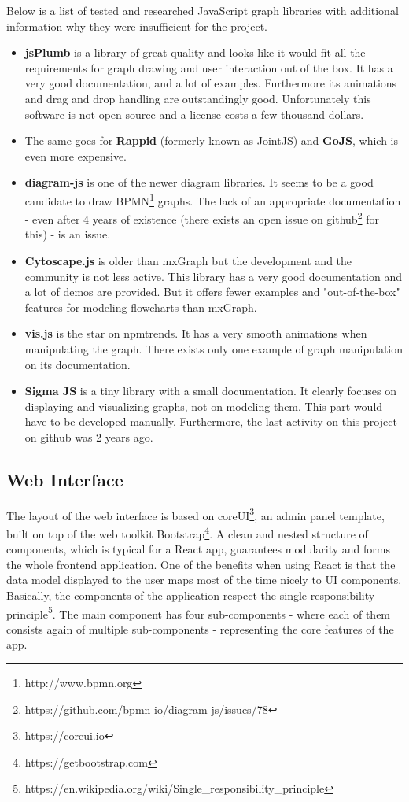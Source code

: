 \documentclass[a4paper,11pt,pdftex,halfparskip,cleardoubleempty,bibtotoc,liststotoc]{scrbook}
\begin{document}
Below is a list of tested and researched JavaScript graph libraries with additional information why they were insufficient for the project.
\begin{itemize}
	\item \textbf{jsPlumb} is a library of great quality and looks like it would fit all the requirements for graph drawing and user interaction out of the box. It has a very good documentation, and a lot of examples. Furthermore its animations and drag and drop handling are outstandingly good. Unfortunately this software is not open source and a license costs a few thousand dollars.
	\item The same goes for \textbf{Rappid} (formerly known as JointJS) and \textbf{GoJS}, which is even more expensive.
	\item \textbf{diagram-js} is one of the newer diagram libraries. It seems to be a good candidate to draw BPMN\footnote{http://www.bpmn.org} graphs. The lack of an appropriate documentation - even after 4 years of existence (there exists an open issue on github\footnote{https://github.com/bpmn-io/diagram-js/issues/78} for this) - is an issue.
	\item \textbf{Cytoscape.js} is older than mxGraph but the development and the community is not less active. This library has a very good documentation and a lot of demos are provided. But it offers fewer examples and "out-of-the-box" features for modeling flowcharts than mxGraph.
	\item \textbf{vis.js} is the star on npmtrends. It has a very smooth animations when manipulating the graph. There exists only one example of graph manipulation on its documentation. 
	\item \textbf{Sigma JS} is a tiny library with a small documentation. It clearly focuses on displaying and visualizing graphs, not on modeling them. This part would have to be developed manually. Furthermore, the last activity on this project on github was 2 years ago.
\end{itemize}

\subsection{Web Interface}

The layout of the web interface is based on coreUI\footnote{https://coreui.io}, an admin panel template, built on top of the web toolkit Bootstrap\footnote{https://getbootstrap.com}. A clean and nested structure of components, which is typical for a React app, guarantees modularity and forms the whole frontend application. One of the benefits when using React is that the data model displayed to the user maps most of the time nicely to UI components. Basically, the components of the application respect the single responsibility principle\footnote{https://en.wikipedia.org/wiki/Single\_responsibility\_principle}. The main component has four sub-components - where each of them consists again of multiple sub-components - representing the core features of the app.
\end{document}

